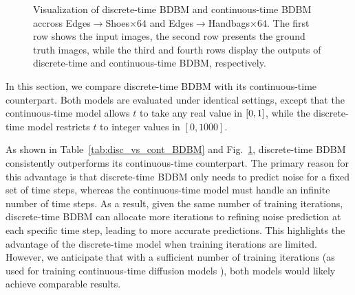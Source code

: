 \begin{figure}
\begin{centering}
\par\end{centering}
\begin{centering}
\par\end{centering}
\caption{Visualization of discrete-time BDBM and continuous-time BDBM accross
Edges$\rightarrow$Shoes$\times64$ and Edges$\rightarrow$Handbags$\times64$.
The first row shows the input images, the second row presents the
ground truth images, while the third and fourth rows display the outputs
of discrete-time and continuous-time BDBM, respectively. \label{fig:disc_vs_cont_BDBM_vis}}
\end{figure}

In this section, we compare discrete-time BDBM with its continuous-time
counterpart. Both models are evaluated under identical settings, except
that the continuous-time model allows $t$ to take any real value
in $\text{\ensuremath{\left[0,1\right]}}$, while the discrete-time
model restricts $t$ to integer values in $\left[0,1000\right]$. 

As shown in Table~\ref{tab:disc_vs_cont_BDBM} and Fig.~\ref{fig:disc_vs_cont_BDBM_vis},
discrete-time BDBM consistently outperforms its continuous-time counterpart.
The primary reason for this advantage is that discrete-time BDBM only
needs to predict noise for a fixed set of time steps, whereas the
continuous-time model must handle an infinite number of time steps.
As a result, given the same number of training iterations, discrete-time
BDBM can allocate more iterations to refining noise prediction at
each specific time step, leading to more accurate predictions. This
highlights the advantage of the discrete-time model when training
iterations are limited. However, we anticipate that with a sufficient
number of training iterations (as used for training continuous-time
diffusion models \cite{song2020score}), both models would likely
achieve comparable results.



